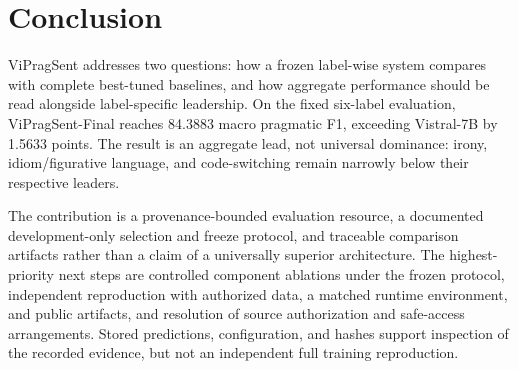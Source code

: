 \section{Conclusion}
\label{sec:conclusion}

ViPragSent addresses two questions: how a frozen label-wise system compares with complete best-tuned baselines, and how aggregate performance should be read alongside label-specific leadership. On the fixed six-label evaluation, ViPragSent-Final reaches 84.3883 macro pragmatic F1, exceeding Vistral-7B by 1.5633 points. The result is an aggregate lead, not universal dominance: irony, idiom/figurative language, and code-switching remain narrowly below their respective leaders.

The contribution is a provenance-bounded evaluation resource, a documented development-only selection and freeze protocol, and traceable comparison artifacts rather than a claim of a universally superior architecture. The highest-priority next steps are controlled component ablations under the frozen protocol, independent reproduction with authorized data, a matched runtime environment, and public artifacts, and resolution of source authorization and safe-access arrangements. Stored predictions, configuration, and hashes support inspection of the recorded evidence, but not an independent full training reproduction.
